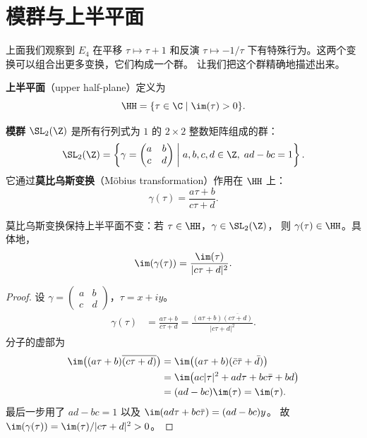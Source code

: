 \section{模群与上半平面}
\label{sec:modular-group-action}

上面我们观察到 $E_4$ 在平移 $\tau \mapsto \tau + 1$ 和反演 $\tau \mapsto -1/\tau$
下有特殊行为。这两个变换可以组合出更多变换，它们构成一个群。
让我们把这个群精确地描述出来。

\begin{definition}[上半平面]
\label{def:upper-half-plane}
\textbf{上半平面}（upper half-plane）定义为
\[
  \HH = \{ \tau \in \C \mid \im(\tau) > 0 \}.
\]
\end{definition}

\begin{definition}[模群]
\label{def:modular-group}
\textbf{模群} $\SL_2(\Z)$ 是所有行列式为 $1$ 的 $2 \times 2$ 整数矩阵组成的群：
\[
  \SL_2(\Z) = \left\{
    \gamma = \begin{pmatrix} a & b \\ c & d \end{pmatrix}
    \;\middle|\; a, b, c, d \in \Z,\; ad - bc = 1
  \right\}.
\]
它通过\textbf{莫比乌斯变换}（Möbius transformation）作用在 $\HH$ 上：
\[
  \gamma(\tau) = \frac{a\tau + b}{c\tau + d}.
\]
\end{definition}

\begin{proposition}
\label{prop:mobius-preserves-H}
莫比乌斯变换保持上半平面不变：若 $\tau \in \HH$，$\gamma \in \SL_2(\Z)$，
则 $\gamma(\tau) \in \HH$。具体地，
\[
  \im(\gamma(\tau)) = \frac{\im(\tau)}{|c\tau + d|^2}.
\]
\end{proposition}

\begin{proof}
设 $\gamma = \begin{pmatrix} a & b \\ c & d \end{pmatrix}$，$\tau = x + iy$。
\begin{align}
  \gamma(\tau)
  &= \frac{a\tau + b}{c\tau + d}
  = \frac{(a\tau + b)\overline{(c\tau + d)}}{|c\tau + d|^2}.
\end{align}
分子的虚部为
\begin{align}
  \im\bigl((a\tau + b)\overline{(c\tau + d)}\bigr)
  &= \im\bigl((a\tau + b)(\bar c \bar\tau + \bar d)\bigr) \\
  &= \im\bigl(ac|\tau|^2 + ad\tau + bc\bar\tau + bd\bigr) \\
  &= (ad - bc)\im(\tau) = \im(\tau).
\end{align}
最后一步用了 $ad - bc = 1$ 以及 $\im(ad\tau + bc\bar\tau) = (ad - bc)y$。
故 $\im(\gamma(\tau)) = \im(\tau)/|c\tau + d|^2 > 0$。
\end{proof}

